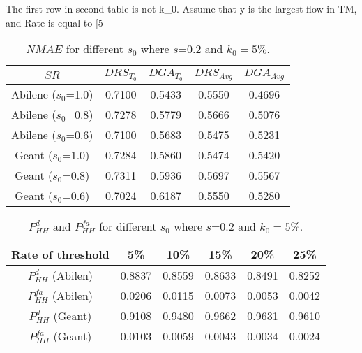 The first row in second table is not k_{0}. Assume that y is the largest flow in TM, and Rate is equal to [5%
 
 
\begin{table}
 \centering
 \small{
  \begin{tabular}{| c | c | c | c | c |}
  \hline
       $SR$                 &    $DRS_{T_{0}}$  &  $DGA_{T_{0}}$  &  $DRS_{Avg}$ &  $DGA_{Avg}$ \\ \hline
      Abilene ($s_{0}$=1.0) & 0.7100 & 0.5433 & 0.5550 & 0.4696        \\ \hline
      Abilene ($s_{0}$=0.8) & 0.7278 & 0.5779 & 0.5666 & 0.5076        \\ \hline
      Abilene ($s_{0}$=0.6) & 0.7100 & 0.5683 & 0.5475 & 0.5231        \\ \hline
      Geant ($s_{0}$=1.0)   & 0.7284 & 0.5860 & 0.5474 & 0.5420         \\ \hline
      Geant ($s_{0}$=0.8)   & 0.7311 & 0.5936 & 0.5697 & 0.5567         \\ \hline

      Geant ($s_{0}$=0.6)   & 0.7024 & 0.6187 & 0.5550 & 0.5280         \\ \hline
    \end{tabular}
 \caption{{$NMAE$ for different $s_{0}$ where $s$=0.2 and $k_{0}=5\%$.}}
 \label{tab:NMAEDGA}
}
\end{table}



\begin{table}
 \centering
 \small{
  \begin{tabular}{| c | c | c | c | c | c |}
  \hline
       Rate  of threshold             &  5\%  &  10\%  &  15\%  & 20\%  & 25\% \\ \hline

      $P^{d}_{HH}$ (Abilen)  & 0.8837 & 0.8559 & 0.8633 & 0.8491 & 0.8252        \\ \hline
      $P^{fa}_{HH}$ (Abilen) & 0.0206 & 0.0115 & 0.0073 & 0.0053 & 0.0042       \\ \hline
      $P^{d}_{HH}$ (Geant)   & 0.9108 & 0.9480 & 0.9662 & 0.9631 & 0.9610        \\ \hline

      $P^{fa}_{HH}$ (Geant)  & 0.0103 & 0.0059 & 0.0043 & 0.0034 & 0.0024        \\ \hline
    \end{tabular}
 \caption{{$P^{d}_{HH}$ and $P^{fa}_{HH}$ for different $s_{0}$ where $s$=0.2 and $k_{0} =5\%$.}}

 \label{tab:PdPfaDGA}
}
\end{table}
